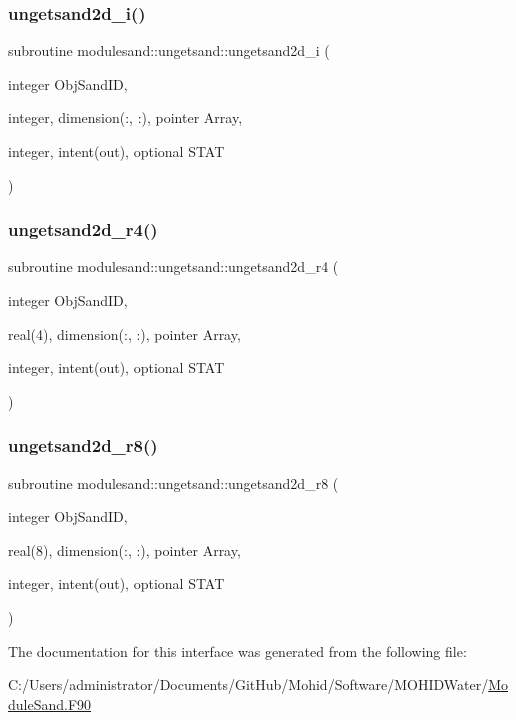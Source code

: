 \subsubsection{\texorpdfstring{ungetsand2d\+\_\+i()}{ungetsand2d\_i()}}
{\footnotesize\ttfamily subroutine modulesand\+::ungetsand\+::ungetsand2d\+\_\+i (\begin{DoxyParamCaption}\item[{integer}]{Obj\+Sand\+ID,  }\item[{integer, dimension(\+:, \+:), pointer}]{Array,  }\item[{integer, intent(out), optional}]{S\+T\+AT }\end{DoxyParamCaption})\hspace{0.3cm}{\ttfamily [private]}}

\mbox{\label{interfacemodulesand_1_1ungetsand_ac1ec79f4bff94a6fe87b1f082e26f3b0}} 
\subsubsection{\texorpdfstring{ungetsand2d\+\_\+r4()}{ungetsand2d\_r4()}}
{\footnotesize\ttfamily subroutine modulesand\+::ungetsand\+::ungetsand2d\+\_\+r4 (\begin{DoxyParamCaption}\item[{integer}]{Obj\+Sand\+ID,  }\item[{real(4), dimension(\+:, \+:), pointer}]{Array,  }\item[{integer, intent(out), optional}]{S\+T\+AT }\end{DoxyParamCaption})\hspace{0.3cm}{\ttfamily [private]}}

\mbox{\label{interfacemodulesand_1_1ungetsand_abe6364bb7fa0ae731ff08a72b2ad6b81}} 
\subsubsection{\texorpdfstring{ungetsand2d\+\_\+r8()}{ungetsand2d\_r8()}}
{\footnotesize\ttfamily subroutine modulesand\+::ungetsand\+::ungetsand2d\+\_\+r8 (\begin{DoxyParamCaption}\item[{integer}]{Obj\+Sand\+ID,  }\item[{real(8), dimension(\+:, \+:), pointer}]{Array,  }\item[{integer, intent(out), optional}]{S\+T\+AT }\end{DoxyParamCaption})\hspace{0.3cm}{\ttfamily [private]}}



The documentation for this interface was generated from the following file\+:\begin{DoxyCompactItemize}
\item 
C\+:/\+Users/administrator/\+Documents/\+Git\+Hub/\+Mohid/\+Software/\+M\+O\+H\+I\+D\+Water/\mbox{\hyperlink{_module_sand_8_f90}{Module\+Sand.\+F90}}\end{DoxyCompactItemize}
